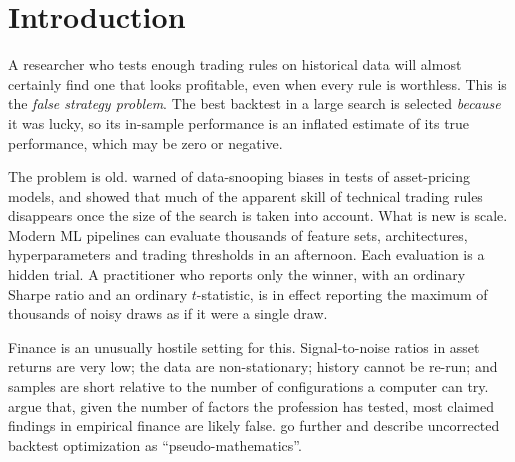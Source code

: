\documentclass[11pt]{article}
\begin{document}
\section{Introduction}

A researcher who tests enough trading rules on historical data will almost certainly find one that looks profitable, even when every rule is worthless. This is the \emph{false strategy problem}. The best backtest in a large search is selected \emph{because} it was lucky, so its in-sample performance is an inflated estimate of its true performance, which may be zero or negative.

The problem is old. \citet{lo1990} warned of data-snooping biases in tests of asset-pricing models, and \citet{sullivan1999} showed that much of the apparent skill of technical trading rules disappears once the size of the search is taken into account. What is new is scale. Modern ML pipelines can evaluate thousands of feature sets, architectures, hyperparameters and trading thresholds in an afternoon. Each evaluation is a hidden trial. A practitioner who reports only the winner, with an ordinary Sharpe ratio and an ordinary $t$-statistic, is in effect reporting the maximum of thousands of noisy draws as if it were a single draw.

Finance is an unusually hostile setting for this. Signal-to-noise ratios in asset returns are very low; the data are non-stationary; history cannot be re-run; and samples are short relative to the number of configurations a computer can try. \citet{harvey2016} argue that, given the number of factors the profession has tested, most claimed findings in empirical finance are likely false. \citet{bailey2014pseudo} go further and describe uncorrected backtest optimization as ``pseudo-mathematics''.
\end{document}
